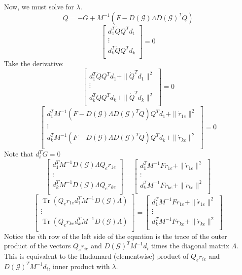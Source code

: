 \documentclass[conference]{article} %
\DeclareMathOperator{\Tr}{Tr}
\begin{document}
Now, we must solve for $\lambda$.
$$\ddot{Q}=-G+M^{-1}(F-D(\mathcal{G})\Lambda D(\mathcal{G})^TQ)$$
$$\begin{bmatrix}
    d_1^T\dot{Q}Q^Td_1\\
    \vdots\\
    d_k^T\dot{Q}Q^Td_k\\
\end{bmatrix}=0$$
Take the derivative:
$$\begin{bmatrix}
    d_1^T\ddot{Q}Q^Td_1+\|\dot{Q}^Td_1\|^2\\
    \vdots\\
    d_k^T\ddot{Q}Q^Td_k+\|\dot{Q}^Td_k\|^2\\
\end{bmatrix}=0$$
$$\begin{bmatrix}
    d_1^TM^{-1}(F-D(\mathcal{G})\Lambda D(\mathcal{G})^TQ)Q^Td_1+\|\dot{r}_{1e}\|^2\\
    \vdots\\
    d_k^TM^{-1}(F-D(\mathcal{G})\Lambda D(\mathcal{G})^TQ)Q^Td_k+\|\dot{r}_{ke}\|^2\\
\end{bmatrix}=0$$
Note that $d_i^TG=0$
$$\begin{bmatrix}
    d_1^TM^{-1}D(\mathcal{G})\Lambda Q_er_{1e}\\
    \vdots\\
    d_k^TM^{-1}D(\mathcal{G})\Lambda Q_er_{ke}\\
\end{bmatrix}=\begin{bmatrix}
    d_1^TM^{-1}Fr_{1e}+\|\dot{r}_{1e}\|^2\\
    \vdots\\
    d_k^TM^{-1}Fr_{ke}+\|\dot{r}_{ke}\|^2\\
\end{bmatrix}$$
$$\begin{bmatrix}
    \Tr\left(Q_er_{1e}d_1^TM^{-1}D(\mathcal{G})\Lambda\right)\\
    \vdots\\
    \Tr\left(Q_er_{ke}d_k^TM^{-1}D(\mathcal{G})\Lambda\right)\\
\end{bmatrix}=\begin{bmatrix}
    d_1^TM^{-1}Fr_{1e}+\|\dot{r}_{1e}\|^2\\
    \vdots\\
    d_k^TM^{-1}Fr_{ke}+\|\dot{r}_{ke}\|^2\\
\end{bmatrix}$$
Notice the $i$th row of the left side of the equation is the trace of the outer product of the vectors $Q_er_{ie}$ and $D(\mathcal{G})^TM^{-1}d_i$ times the diagonal matrix $\Lambda$. This is equivalent to the Hadamard (elementwise) product of $Q_er_{ie}$ and $D(\mathcal{G})^TM^{-1}d_i$, inner product with $\lambda$.
\end{document}
